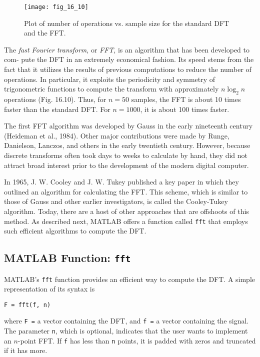 \documentclass[../main.tex]{subfiles}
\begin{document}
\begin{figure}[H] 
	\centering
	\texttt{[image: fig\_16\_10]}
	\caption{\textsf{Plot of number of operations vs. sample size for the standard DFT and the FFT.}}
	\label{fig:fig_16_10}
\end{figure}

The \textit{fast Fourier transform}, or \textit{FFT}, is an algorithm that has been developed to com-
pute the DFT in an extremely economical fashion. Its speed stems from the fact that it
utilizes the results of previous computations to reduce the number of operations. In particular, it exploits the periodicity and symmetry of trigonometric functions to compute
the transform with approximately $n \log_2n$ operations (Fig. 16.10). Thus, for $n = 50$ samples, the FFT is about 10 times faster than the standard DFT. For $n = 1000$, it is about
100 times faster.

The first FFT algorithm was developed by Gauss in the early nineteenth century
(Heideman et al., 1984). Other major contributions were made by Runge, Danielson,
Lanczos, and others in the early twentieth century. However, because discrete transforms
often took days to weeks to calculate by hand, they did not attract broad interest prior to the
development of the modern digital computer.

In 1965, J. W. Cooley and J. W. Tukey published a key paper in which they outlined an
algorithm for calculating the FFT. This scheme, which is similar to those of Gauss and
other earlier investigators, is called the Cooley-Tukey algorithm. Today, there are a host of
other approaches that are offshoots of this method. As described next, MATLAB offers a
function called \texttt{fft} that employs such efficient algorithms to compute the DFT.

\label{cha:cha_P_16_5_2} %
\subsection{MATLAB Function: \texttt{fft}}

\noindent MATLAB's \texttt{fft} function provides an efficient way to compute the DFT. A simple representation of its syntax is

\begin{lstlisting}[numbers=none]
	F = fft(f, n)
\end{lstlisting}

where \texttt{F =} a vector containing the DFT, and \texttt{f =} a vector containing the signal. The
parameter \texttt{n}, which is optional, indicates that the user wants to implement an $n$-point FFT.
If \texttt{f} has less than \texttt{n} points, it is padded with zeros and truncated if it has more.
\end{document}
